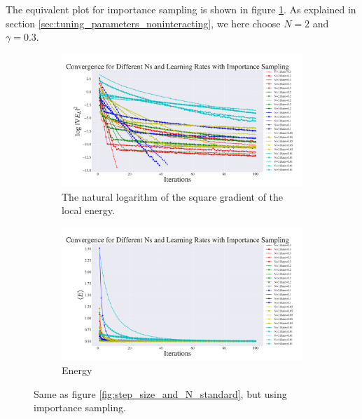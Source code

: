 \documentclass[a4paper, 10pt]{article}
\begin{document}
\linebreak
The equivalent plot for importance sampling is shown in figure \ref{fig:step_size_and_N_importance}. As explained in section \ref{sec:tuning_parameters_noninteracting}, we here choose $N=2$ and $\gamma=0.3$.\\
\begin{figure}
	\centering
	\begin{subfigure}[t]{.9\textwidth}
		\centering
		\includegraphics[width=\textwidth]{../Results/grad_importance.pdf}
		\caption{The natural logarithm of the square gradient of the local energy.}
	\end{subfigure}%
	
	\begin{subfigure}[b]{.9\textwidth}
		\centering
		\includegraphics[width=\textwidth]{../Results/energy_importance.pdf}
		\caption{Energy}
	\end{subfigure}%
	\caption{Same as figure \ref{fig:step_size_and_N_standard}, but using importance sampling.}\label{fig:step_size_and_N_importance}
\end{figure}\\
\linebreak
\end{document}
